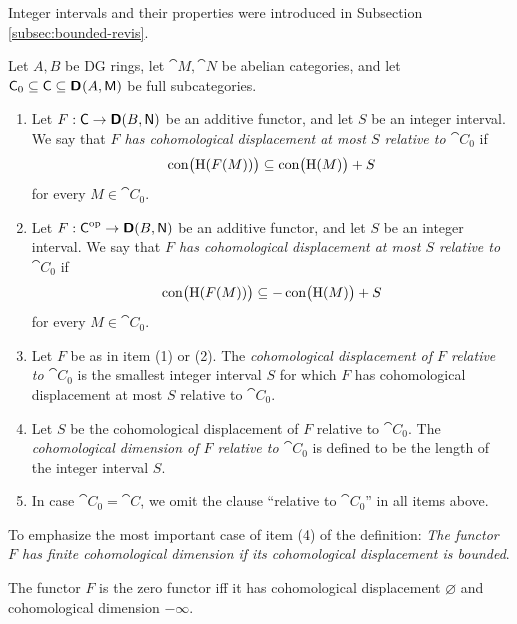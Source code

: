 Integer intervals and their properties were introduced in Subsection 
\ref{subsec:bounded-revis}.

\begin{dfn} \label{dfn:2126}
Let $A, B$ be DG rings, let $\cat{M}, \cat{N}$ be abelian categories, and let 
$\operatorname{\mathsf{C}}_0 \subseteq \operatorname{\mathsf{C}} \subseteq \boldsymbol{\mathsf{D}}^{}(A, \operatorname{\mathsf{M}})$
be full subcategories. 
\begin{enumerate}
\item Let  
$F : \operatorname{\mathsf{C}} \to \boldsymbol{\mathsf{D}}(B, \operatorname{\mathsf{N}})$
be an additive functor, and let $S$ be an integer interval. We say that 
{\em $F$ has cohomological displacement at 
most $S$ relative to $\cat{C}_0$}%
if 
\[ \operatorname{con} \bigl( \operatorname{H}(F(M)) \bigr) \subseteq
\operatorname{con} \bigl( \operatorname{H}(M) \bigr) + S \]
for every $M \in \cat{C}_0$.

\item Let 
$F : \operatorname{\mathsf{C}}^{\mathrm{op}} \to \boldsymbol{\mathsf{D}}(B, \operatorname{\mathsf{N}})$
be an additive functor, 
and let $S$ be an integer interval. We say that {\em $F$ has 
cohomological displacement at most 
$S$ relative to $\cat{C}_0$}%
if 
\[ \operatorname{con} \bigl( \operatorname{H}(F(M)) \bigr) \subseteq
- \operatorname{con} \bigl( \operatorname{H}(M) \bigr) + S \]
for every $M \in \cat{C}_0$.

\item Let $F$ be as in item (1) or (2).
The {\em cohomological displacement of $F$ relative to $\cat{C}_0$} is the 
smallest integer interval $S$ for which $F$ has cohomological 
displacement at most $S$ relative to $\cat{C}_0$. 

\item Let $S$ be the cohomological displacement of $F$ relative to 
$\cat{C}_0$. The 
{\em cohomological dimension of $F$  relative to $\cat{C}_0$}%
is defined to be the length of the integer interval $S$. 

\item In case $\cat{C}_0 = \cat{C}$, we omit the clause ``relative to 
$\cat{C}_0$'' in all items above. 
\end{enumerate}
\end{dfn}

To emphasize the most important case of item (4) of the definition: {\em The 
functor $F$ has finite cohomological dimension if its cohomological 
displacement 
is bounded}. 

\begin{exa} \label{exa:2140}
The functor $F$ is the zero functor iff it has cohomological displacement 
$\varnothing$ and cohomological dimension $-\infty$. 
\end{exa}

